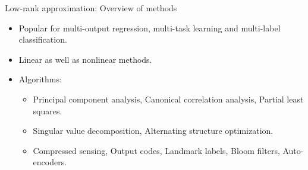 \begin{frame}{Low-rank approximation: Overview of methods}
	
	\begin{itemize}
		\item Popular for multi-output regression, multi-task learning and multi-label classification.
		\item Linear as well as nonlinear methods.
		\item Algorithms: 
		\begin{itemize}
			\item Principal component analysis, Canonical correlation analysis, Partial least squares.
			\item Singular value decomposition, Alternating structure optimization.
			\item Compressed sensing, Output codes, Landmark labels, Bloom filters, Auto-encoders.
		\end{itemize}
	\end{itemize}
	\vspace{0.3cm}
\end{frame}


%
\endlecture

